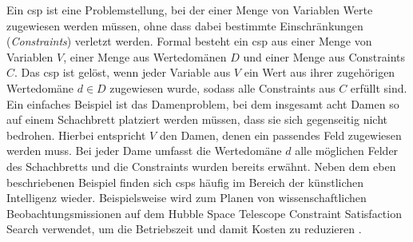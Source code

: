 Ein \ac{csp} ist eine Problemstellung, bei der einer Menge von Variablen Werte zugewiesen werden müssen, ohne dass dabei bestimmte Einschränkungen (\textit{Constraints}) 
verletzt werden. Formal besteht ein \ac{csp} aus einer Menge von Variablen $V$, einer Menge aus Wertedomänen $D$ und einer Menge aus Constraints $C$. Das \ac{csp} ist gelöst,
wenn jeder Variable aus $V$ ein Wert aus ihrer zugehörigen Wertedomäne $d \in D$ zugewiesen wurde, sodass alle Constraints aus $C$ erfüllt sind. Ein einfaches Beispiel ist das
Damenproblem, bei dem insgesamt acht Damen so auf einem Schachbrett platziert werden müssen, dass sie sich gegenseitig nicht bedrohen. Hierbei entspricht $V$ den Damen, denen
ein passendes Feld zugewiesen werden muss. Bei jeder Dame umfasst die Wertedomäne $d$ alle möglichen Felder des Schachbretts und die Constraints wurden bereits erwähnt. Neben
dem eben beschriebenen Beispiel finden sich \acp{csp} häufig im Bereich der künstlichen Intelligenz wieder. Beispielsweise wird zum Planen von wissenschaftlichen
Beobachtungsmissionen auf dem Hubble Space Telescope Constraint Satisfaction Search verwendet, um die Betriebszeit und damit Kosten zu reduzieren \cite{HubbleScheduling}.